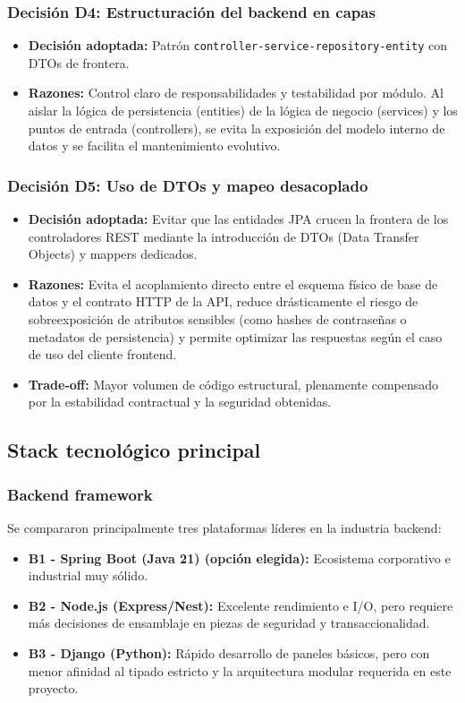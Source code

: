 \subsubsection*{Decisi\'on D4: Estructuraci\'on del backend en capas}
\begin{itemize}
    \item \textbf{Decisi\'on adoptada:} Patr\'on \texttt{controller-service-repository-entity} con DTOs de frontera.
    \item \textbf{Razones:} Control claro de responsabilidades y testabilidad por m\'odulo. Al aislar la l\'ogica de persistencia (entities) de la l\'ogica de negocio (services) y los puntos de entrada (controllers), se evita la exposici\'on del modelo interno de datos y se facilita el mantenimiento evolutivo.
\end{itemize}

\subsubsection*{Decisi\'on D5: Uso de DTOs y mapeo desacoplado}
\begin{itemize}
    \item \textbf{Decisi\'on adoptada:} Evitar que las entidades JPA crucen la frontera de los controladores REST mediante la introducci\'on de DTOs (Data Transfer Objects) y mappers dedicados.
    \item \textbf{Razones:} Evita el acoplamiento directo entre el esquema f\'isico de base de datos y el contrato HTTP de la API, reduce dr\'asticamente el riesgo de sobreexposici\'on de atributos sensibles (como hashes de contrase\~nas o metadatos de persistencia) y permite optimizar las respuestas seg\'un el caso de uso del cliente frontend.
    \item \textbf{Trade-off:} Mayor volumen de c\'odigo estructural, plenamente compensado por la estabilidad contractual y la seguridad obtenidas.
\end{itemize}

\FloatBarrier
\subsection{Stack tecnol\'ogico principal}

\subsubsection*{Backend framework}
Se compararon principalmente tres plataformas l\'ideres en la industria backend:
\begin{itemize}
    \item \textbf{B1 - Spring Boot (Java 21) (opci\'on elegida):} Ecosistema corporativo e industrial muy s\'olido.
    \item \textbf{B2 - Node.js \cite{nodejs} (Express/Nest):} Excelente rendimiento e I/O, pero requiere m\'as decisiones de ensamblaje en piezas de seguridad y transaccionalidad.
    \item \textbf{B3 - Django (Python):} R\'apido desarrollo de paneles b\'asicos, pero con menor afinidad al tipado estricto y la arquitectura modular requerida en este proyecto.
\end{itemize}

